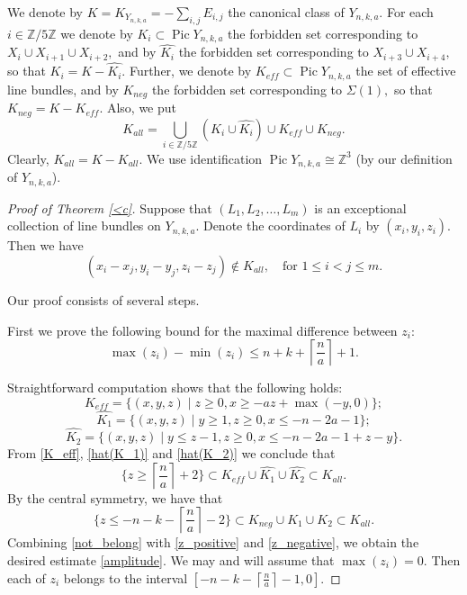 \documentclass[11pt,leqno]{amsart}
\numberwithin{equation}{section}
\def\Z{\mathbb{Z}}
\newcommand{\Pic}{\operatorname{Pic}}
\begin{document}
We denote by $K=K_{Y_{n,k,a}}=-\sum\limits_{i,j}E_{i,j}$ the canonical class of $Y_{n,k,a}.$ For each $i\in\Z/5\Z$ we denote by $K_{i}\subset \Pic Y_{n,k,a}$ the forbidden set corresponding to $X_{i}\cup X_{i+1}\cup X_{i+2},$ and
by $\widehat{K_i}$ the forbidden set corresponding to $X_{i+3}\cup X_{i+4},$ so that $K_{i}=K-\widehat{K_i}.$ Further,
we denote by $K_{eff}\subset \Pic Y_{n,k,a}$ the set of effective line bundles, and by $K_{neg}$ the forbidden set corresponding to $\Sigma(1),$ so that
$K_{neg}=K-K_{eff}.$ Also, we put
$$K_{all}=\bigcup\limits_{i\in\Z/5\Z}\left(K_i\cup\widehat{K_i}\right)\cup K_{eff}\cup K_{neg}.$$
Clearly, $K_{all}=K-K_{all}.$
We use identification $\Pic Y_{n,k,a}\cong\Z^3$ (by our definition of $Y_{n,k,a}$).

\begin{proof}[Proof of Theorem \ref{<c}] Suppose that $(L_1,L_2,\dots,L_m)$ is an exceptional collection of line bundles on $Y_{n,k,a}.$
Denote the coordinates of $L_i$ by $(x_i,y_i,z_i).$ Then we have
\begin{equation}\label{not_belong}(x_i-x_j,y_i-y_j,z_i-z_j)\notin K_{all},\quad\text{for }1\leq i<j\leq m.\end{equation}

Our proof consists of several steps.

{} First we prove the following bound for the maximal difference between $z_i:$
\begin{equation}\label{amplitude}\max(z_i)-\min(z_i)\leq n+k+\left\lceil\frac{n}a\right\rceil+1.\end{equation}

Straightforward computation shows that the following holds:
\begin{equation}\label{K_eff}K_{eff}=\{(x,y,z)\mid z\geq 0, x\geq -az+\max(-y,0)\};\end{equation}
\begin{equation}\label{hat(K_1)}\widehat{K_1}=\{(x,y,z)\mid y\geq 1, z\geq 0, x\leq -n-2a-1\};\end{equation}
\begin{equation}\label{hat(K_2)}\widehat{K_2}=\{(x,y,z)\mid y\leq z-1, z\geq 0, x\leq -n-2a-1+z-y\}.\end{equation}
From \eqref{K_eff}, \eqref{hat(K_1)} and \eqref{hat(K_2)} we conclude that
\begin{equation}\label{z_positive}\{z\geq \left\lceil \frac{n}a\right\rceil+2\}\subset K_{eff}\cup \widehat{K_1}\cup\widehat{K_2}\subset K_{all}.\end{equation}
By the central symmetry, we have that
\begin{equation}\label{z_negative}\{z\leq -n-k-\left\lceil \frac{n}a\right\rceil-2\}\subset K_{neg}\cup K_1\cup K_2\subset K_{all}.\end{equation}
Combining \eqref{not_belong} with \eqref{z_positive} and \eqref{z_negative}, we obtain the desired estimate \eqref{amplitude}.
We may and will assume that $\max(z_i)=0.$ Then each of $z_i$ belongs to the interval $[-n-k-\left\lceil\frac{n}a\right\rceil-1,0].$


\end{proof}
\end{document}
